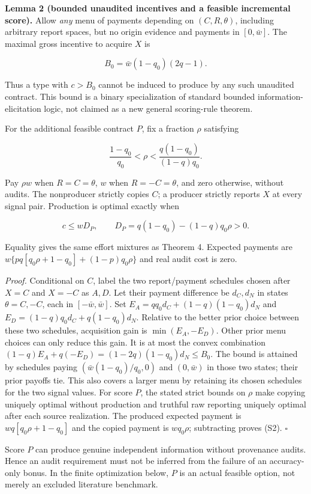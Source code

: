 \documentclass[
  11pt,
]{article}
\begin{document}
\textbf{Lemma 2 (bounded unaudited incentives and a feasible incremental
score).} Allow \emph{any} menu of payments depending on
\((C,R,\theta)\), including arbitrary report spaces, but no origin
evidence and payments in \([0,\bar w]\). The maximal gross incentive to
acquire \(X\) is

\[B_0=\bar w(1-q_0)(2q-1). \tag{S1}\]

Thus a type with \(c>B_0\) cannot be induced to produce by any such
unaudited contract. This bound is a binary specialization of standard
bounded information-elicitation logic, not claimed as a new general
scoring-rule theorem.

For the additional feasible contract \(P\), fix a fraction \(\rho\)
satisfying

\[\frac{1-q_0}{q_0}<\rho<\frac{q(1-q_0)}{(1-q)q_0}.\]

Pay \(\rho w\) when \(R=C=\theta\), \(w\) when \(R=-C=\theta\), and zero
otherwise, without audits. The nonproducer strictly copies \(C\); a
producer strictly reports \(X\) at every signal pair. Production is
optimal exactly when

\[c\leq wD_P,\qquad D_P=q(1-q_0)-(1-q)q_0\rho>0. \tag{S2}\]

Equality gives the same effort mixtures as Theorem 4. Expected payments
are \(w\{p q[q_0\rho+1-q_0]+(1-p)q_0\rho\}\) and real audit cost is
zero.

\emph{Proof.} Conditional on \(C\), label the two report/payment
schedules chosen after \(X=C\) and \(X=-C\) as \(A,D\). Let their
payment difference be \(d_C,d_N\) in states \(\theta=C,-C\), each in
\([-\bar w,\bar w]\). Set \(E_A=q q_0d_C+(1-q)(1-q_0)d_N\) and
\(E_D=(1-q)q_0d_C+q(1-q_0)d_N\). Relative to the better prior choice
between these two schedules, acquisition gain is \(\min(E_A,-E_D)\).
Other prior menu choices can only reduce this gain. It is at most the
convex combination \((1-q)E_A+q(-E_D)=(1-2q)(1-q_0)d_N\leq B_0\). The
bound is attained by schedules paying \((\bar w(1-q_0)/q_0,0)\) and
\((0,\bar w)\) in those two states; their prior payoffs tie. This also
covers a larger menu by retaining its chosen schedules for the two
signal values. For score \(P\), the stated strict bounds on \(\rho\)
make copying uniquely optimal without production and truthful raw
reporting uniquely optimal after each source realization. The produced
expected payment is \(wq[q_0\rho+1-q_0]\) and the copied payment is
\(wq_0\rho\); subtracting proves (S2). \(\square\)

Score \(P\) can produce genuine independent information without
provenance audits. Hence an audit requirement must not be inferred from
the failure of an accuracy-only bonus. In the finite optimization below,
\(P\) is an actual feasible option, not merely an excluded literature
benchmark.
\end{document}
